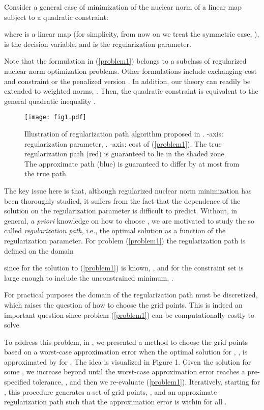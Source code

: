 \documentclass{article}
\begin{document}
Consider a general case of minimization of the nuclear norm of a linear map subject to a quadratic constraint:


where  is a linear map (for simplicity, from now on we treat the symmetric case, ),  is the decision variable, and  is the regularization parameter.

Note that the formulation in (\ref{problem1}) belongs to a subclass of regularized nuclear norm optimization problems. Other formulations include exchanging cost and constraint or the penalized version \cite{Rojas:2014}. In addition, our theory can readily be extended to weighted norms, . Then, the quadratic constraint is equivalent to the general quadratic inequality . 

\begin{figure*}
  \texttt{[image: fig1.pdf]}
  \caption{Illustration of regularization path algorithm proposed in \cite{Blomberg:2014}. -axis: regularization parameter, . -axis: cost of (\ref{problem1}). The true regularization path (red) is guaranteed to lie in the shaded zone. The approximate path (blue) is guaranteed to differ by at most  from the true path.}
\end{figure*}

The key issue here is that, although regularized nuclear norm minimization has been thoroughly studied, it suffers from the fact that the dependence of the solution on the regularization parameter is difficult to predict. Without, in general, \textit{a priori} knowledge on how to choose , we are motivated to study the so called \textit{regularization path}, i.e., the optimal solution as a function of the regularization parameter. For problem (\ref{problem1}) the regularization path is defined on the domain

since for  the solution to (\ref{problem1}) is known, , and for  the constraint set is large enough to include the unconstrained minimum, . 

For practical purposes the domain of the regularization path must be discretized, which raises the question of how to choose the grid points. This is indeed an important question since problem (\ref{problem1}) can be computationally costly to solve. 

To address this problem, in \cite{Blomberg:2014}, we presented a method to choose the grid points based on a worst-case approximation error when the optimal solution for , , is approximated by  for . The idea is visualized in Figure 1. Given the solution for some , we increase  beyond  until the worst-case approximation error reaches a pre-specified tolerance, , and then we re-evaluate (\ref{problem1}). Iteratively, starting for , this procedure generates a set of grid points, , and an approximate regularization path such that the approximation error is within  for all .
\end{document}

